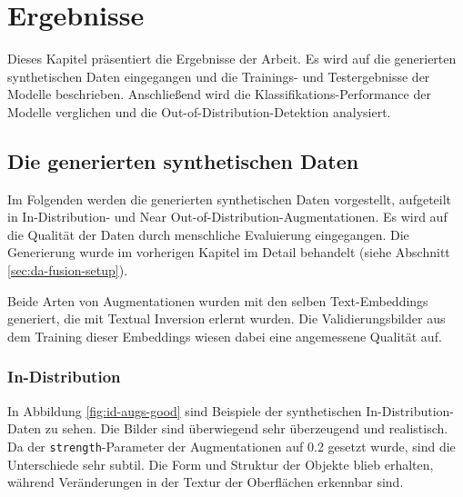 \chapter{Ergebnisse} \label{sec:results}

Dieses Kapitel präsentiert die Ergebnisse der Arbeit. Es wird auf die generierten synthetischen Daten eingegangen und die Trainings- und Testergebnisse der Modelle beschrieben. Anschließend wird die Klassifikations-Performance der Modelle verglichen und die Out-of-Distribution-Detektion analysiert.

\section{Die generierten synthetischen Daten} \label{sec:da-fusion-results}

Im Folgenden werden die generierten synthetischen Daten vorgestellt, aufgeteilt in In-Distribution- und Near Out-of-Distribution-Augmentationen. Es wird auf die Qualität der Daten durch menschliche Evaluierung eingegangen. Die Generierung wurde im vorherigen Kapitel im Detail behandelt (siehe Abschnitt \ref{sec:da-fusion-setup}).

Beide Arten von Augmentationen wurden mit den selben Text-Embeddings generiert, die mit Textual Inversion erlernt wurden. Die Validierungsbilder aus dem Training dieser Embeddings wiesen dabei eine angemessene Qualität auf.

\subsection{In-Distribution} \label{sec:da-fusion-id-results}

In Abbildung \ref{fig:id-augs-good} sind Beispiele der synthetischen In-Distribution-Daten zu sehen. Die Bilder sind überwiegend sehr überzeugend und realistisch. Da der \lstinline{strength}-Parameter der Augmentationen auf 0.2 gesetzt wurde, sind die Unterschiede sehr subtil. Die Form und Struktur der Objekte blieb erhalten, während Veränderungen in der Textur der Oberflächen erkennbar sind.

